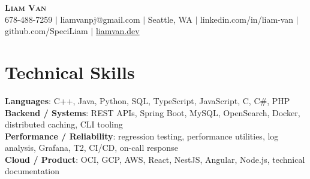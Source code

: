 \documentclass[letterpaper,11pt]{article}
\begin{document}

%
\begin{center}
    \textbf{\Huge \scshape Liam Van} \\ \vspace{1pt}
    \small 678-488-7259 $|$ \small {liamvanpj@gmail.com} $|$ Seattle, WA
 {{$|$ linkedin.com/in/liam-van} {$|$ github.com/SpeciLiam} {$|$ \href{https://liamvan.dev}{liamvan.dev}}}

\end{center}

\section{Technical Skills}
 \begin{itemize}[leftmargin=0.15in, label={}]
    \small{\item{
     \textbf{Languages}{: C++, Java, Python, SQL, TypeScript, JavaScript, C, C\#, PHP} \\
     \textbf{Backend / Systems}{: REST APIs, Spring Boot, MySQL, OpenSearch, Docker, distributed caching, CLI tooling} \\
     \textbf{Performance / Reliability}{: regression testing, performance utilities, log analysis, Grafana, T2, CI/CD, on-call response} \\
     \textbf{Cloud / Product}{: OCI, GCP, AWS, React, NestJS, Angular, Node.js, technical documentation} \\
    }}
 \end{itemize}
%

\end{document}
